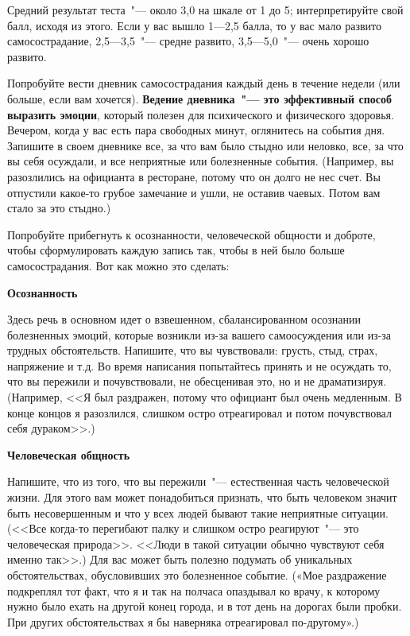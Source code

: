 \vspace{3ex}

Средний результат теста~"--- около 3,0 на шкале от 1 до 5; интерпретируйте свой балл, исходя из этого. 
Если у вас вышло 1---2,5 балла, то у вас мало развито самосострадание, 2,5---3,5~"--- средне развито, 3,5---5,0~"--- очень хорошо развито.

\newpage



Попробуйте вести дневник самосострадания каждый день в течение недели (или больше, если вам хочется). \textbf{Ведение дневника~"--- это эффективный способ выразить эмоции}, который полезен для психического и физического здоровья.
Вечером, когда у вас есть пара свободных минут, оглянитесь на события дня. Запишите в своем дневнике все, за что вам было стыдно или неловко, все, за что вы себя осуждали, и все неприятные или болезненные события. (Например, вы разозлились на официанта в ресторане, потому что он долго не нес счет. Вы отпустили какое-то грубое замечание и ушли, не оставив чаевых. Потом вам стало за это стыдно.)

Попробуйте прибегнуть к осознанности, человеческой общности и доброте, чтобы сформулировать каждую запись так, чтобы в ней было больше самосострадания. Вот как можно это сделать:
\vspace{3ex}

\textbf{Осознанность}

Здесь речь в основном идет о взвешенном, сбалансированном осознании болезненных эмоций, которые возникли из-за вашего самоосуждения или из-за трудных обстоятельств. Напишите, что вы чувствовали: грусть, стыд, страх, напряжение и т.д. Во время написания попытайтесь принять и не осуждать то, что вы пережили и почувствовали, не обесценивая это, но и не драматизируя. (Например, <<Я был раздражен, потому что официант был очень медленным. В конце концов я разозлился, слишком остро отреагировал и потом почувствовал себя дураком>>.) 
\vspace{3ex}

\textbf{Человеческая общность}

Напишите, что из того, что вы пережили~"--- естественная часть человеческой жизни. Для этого вам может понадобиться признать, что быть человеком значит быть несовершенным и что у всех людей бывают такие неприятные ситуации. (<<Все когда-то перегибают палку и слишком остро реагируют~"--- это человеческая природа>>. <<Люди в такой ситуации обычно чувствуют себя именно так>>.) Для вас может быть полезно подумать об уникальных обстоятельствах, обусловивших это болезненное событие. («Мое раздражение подкреплял тот факт, что я и так на полчаса опаздывал ко врачу, к которому нужно было ехать на другой конец города, и в тот день на дорогах были пробки. При других обстоятельствах я бы наверняка отреагировал по-другому».) 
\vspace{3ex}

